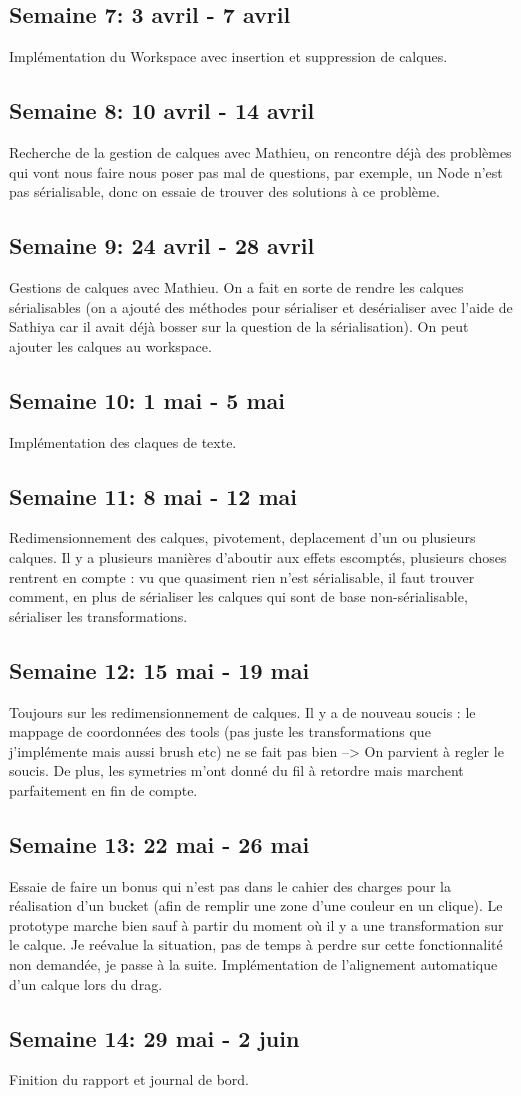 \subsection{Semaine 7: 3 avril - 7 avril}
Implémentation du Workspace avec insertion et suppression de calques.
\subsection{Semaine 8: 10 avril - 14 avril}
Recherche de la gestion de calques avec Mathieu, on rencontre déjà des problèmes qui vont nous faire nous poser pas mal de questions, par exemple, un Node n'est pas sérialisable, donc on essaie de trouver des solutions à ce problème.
\subsection{Semaine 9: 24 avril - 28 avril}
Gestions de calques avec Mathieu. On a fait en sorte de rendre les calques sérialisables (on a ajouté des méthodes pour sérialiser et desérialiser avec l'aide de Sathiya car il avait déjà bosser sur la question de la sérialisation). On peut ajouter les calques au workspace.
\subsection{Semaine 10: 1 mai - 5 mai}
Implémentation des claques de texte.
\subsection{Semaine 11: 8 mai - 12 mai} 
Redimensionnement des calques, pivotement, deplacement d'un ou plusieurs calques. Il y a plusieurs manières d'aboutir aux effets escomptés, plusieurs choses rentrent en compte : vu que quasiment rien n'est sérialisable, il faut trouver comment, en plus de sérialiser les calques qui sont de base non-sérialisable, sérialiser les transformations.
\subsection{Semaine 12: 15 mai - 19 mai}
Toujours sur les redimensionnement de calques. Il y a de nouveau soucis : le mappage de coordonnées des tools (pas juste les transformations que j'implémente mais aussi brush etc) ne se fait pas bien --> On parvient à regler le soucis. De plus, les symetries m'ont donné du fil à retordre mais marchent parfaitement en fin de compte.
\subsection{Semaine 13: 22 mai - 26 mai}
Essaie de faire un bonus qui n'est pas dans le cahier des charges pour la réalisation d'un bucket (afin de remplir une zone d'une couleur en un clique). Le prototype marche bien sauf à partir du moment où il y a une transformation sur le calque. Je reévalue la situation, pas de temps à perdre sur cette fonctionnalité non demandée, je passe à la suite. Implémentation de l'alignement automatique d'un calque lors du drag.
\subsection{Semaine 14: 29 mai - 2 juin}
Finition du rapport et journal de bord.





